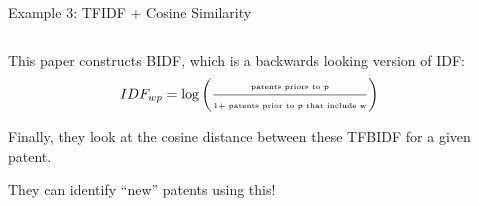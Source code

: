\documentclass[notes,11pt, aspectratio=169]{beamer}
\newenvironment{wideitemize}{\itemize\addtolength{\itemsep}{10pt}}{\enditemize}
\begin{document}
  \begin{frame}{Example 3: TFIDF + Cosine Similarity}
    \begin{columns}[onlytextwidth, T] %
      \begin{column}{.5\textwidth}
        \begin{wideitemize}
        \item This paper constructs BIDF, which is a backwards looking version of IDF:
          \begin{equation}
            \tiny IDF_{wp} = \log\left(\frac{\text{patents priors to p}}{\text{1+ patents prior to p that include w}}\right)
          \end{equation}
        \item Finally, they look at the cosine distance between these TFBIDF for a given patent.
          \item They can identify ``new'' patents using this!
        \end{wideitemize}
      \end{column}%
      \hfill%
      \begin{column}{.5\textwidth}
      \end{column}%
    \end{columns}
  \end{frame}

  
  
\end{document}
